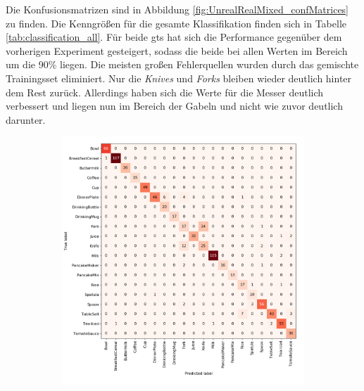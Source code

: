 Die Konfusionsmatrizen sind in Abbildung \ref{fig:UnrealRealMixed_confMatrices} zu finden. Die Kenngrößen für die gesamte Klassifikation finden sich in Tabelle \ref{tab:classification_all}. Für beide \gls{gt}s hat sich die Performance gegenüber dem vorherigen Experiment gesteigert, sodass die beide bei allen Werten im Bereich um die 90\% liegen. Die meisten großen Fehlerquellen wurden durch das gemischte Trainingsset eliminiert. Nur die \textit{Knives} und \textit{Forks} bleiben wieder deutlich hinter dem Rest zurück. Allerdings haben sich die Werte für die Messer deutlich verbessert und liegen nun im Bereich der Gabeln und nicht wie zuvor deutlich darunter.  \par 

\begin{figure}
\centering
	\begin{subfigure}[b]{1\textwidth}
	\centering
	\includegraphics[scale=.29]{img/chapter6/UnrealRealMixedGTClass.png}
	\end{subfigure}
	\begin{subfigure}[b]{1\textwidth}
	\centering

\end{subfigure}
\end{figure}
